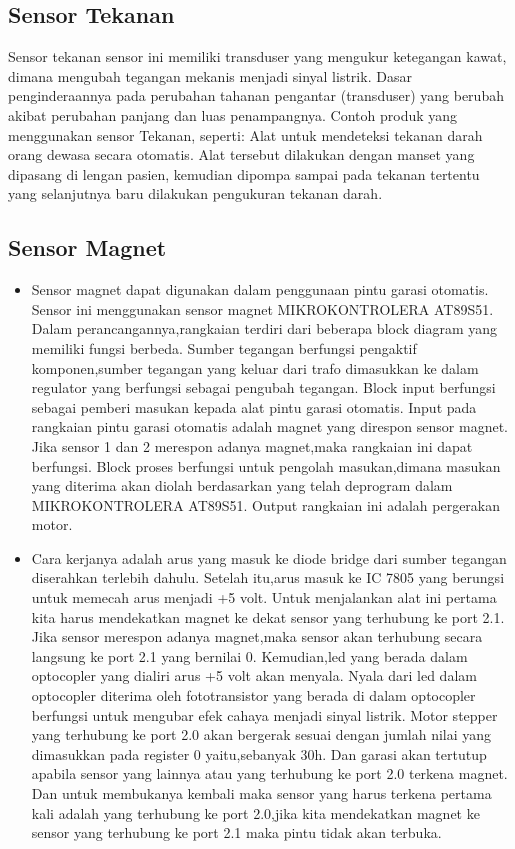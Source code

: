 \subsection{Sensor Tekanan}
Sensor tekanan sensor ini memiliki transduser yang mengukur ketegangan kawat, dimana mengubah tegangan mekanis menjadi sinyal listrik. Dasar penginderaannya pada perubahan tahanan pengantar (transduser) yang berubah akibat perubahan panjang dan luas penampangnya. Contoh produk yang menggunakan sensor Tekanan, seperti: Alat untuk mendeteksi tekanan darah orang dewasa secara otomatis. Alat tersebut dilakukan dengan manset yang dipasang di lengan pasien, kemudian dipompa sampai pada tekanan tertentu yang selanjutnya baru dilakukan pengukuran tekanan darah.
	
\subsection{Sensor Magnet}
	\begin	{itemize}
	\item Sensor magnet dapat digunakan dalam penggunaan pintu garasi otomatis. Sensor ini menggunakan sensor magnet MIKROKONTROLERA AT89S51. Dalam perancangannya,rangkaian terdiri dari beberapa block diagram yang memiliki fungsi berbeda. Sumber tegangan berfungsi pengaktif komponen,sumber tegangan yang keluar dari trafo dimasukkan ke dalam regulator yang berfungsi sebagai pengubah tegangan. Block input berfungsi sebagai pemberi masukan kepada alat pintu garasi otomatis. Input pada rangkaian pintu garasi otomatis adalah magnet yang direspon sensor magnet. Jika sensor 1 dan 2 merespon adanya magnet,maka rangkaian ini dapat berfungsi. Block proses berfungsi untuk pengolah masukan,dimana masukan yang diterima akan diolah berdasarkan yang telah deprogram dalam MIKROKONTROLERA AT89S51. Output rangkaian ini adalah pergerakan motor. 
	\item Cara kerjanya adalah arus yang masuk ke diode bridge dari sumber tegangan diserahkan terlebih dahulu. Setelah itu,arus masuk  ke IC 7805 yang berungsi untuk memecah arus menjadi +5 volt. Untuk menjalankan alat ini pertama kita harus mendekatkan magnet ke dekat sensor yang terhubung ke port 2.1. Jika sensor merespon adanya magnet,maka sensor akan terhubung secara langsung ke port 2.1 yang bernilai 0. Kemudian,led yang berada dalam optocopler yang dialiri arus +5 volt akan menyala. Nyala dari led dalam optocopler diterima oleh fototransistor yang berada di dalam optocopler berfungsi untuk mengubar efek cahaya menjadi sinyal listrik.
		  Motor stepper yang terhubung ke port 2.0 akan bergerak sesuai dengan jumlah nilai yang dimasukkan pada register 0 yaitu,sebanyak 30h. Dan garasi akan tertutup apabila sensor yang lainnya atau yang terhubung ke port 2.0 terkena magnet. Dan untuk membukanya kembali maka sensor yang harus terkena pertama kali adalah yang terhubung ke port 2.0,jika kita mendekatkan magnet ke sensor yang terhubung  ke port 2.1 maka pintu tidak akan terbuka.
	\end{itemize}
	

